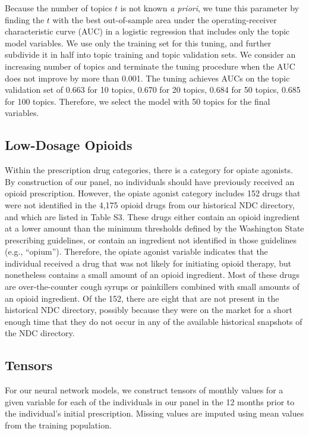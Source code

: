 \documentclass[9pt,twoside]{pnas-new}
\begin{document}
Because the number of topics $t$ is not known \emph{a priori}, we tune this parameter by finding the $t$ with the best out-of-sample area under the operating-receiver characteristic curve (AUC) in a logistic regression that includes only the topic model variables. We use only the training set for this tuning, and further subdivide it in half into topic training and topic validation sets. We consider an increasing number of topics and terminate the tuning procedure when the AUC does not improve by more than 0.001. The tuning achieves AUCs on the topic validation set of 0.663 for 10 topics, 0.670 for 20 topics, 0.684 for 50 topics, 0.685 for 100 topics. Therefore, we select the model with 50 topics for the final variables.

\subsection{Low-Dosage Opioids}

Within the prescription drug categories, there is a category for opiate agonists. By construction of our panel, no individuals should have previously received an opioid prescription. However, the opiate agonist category includes 152 drugs that were not identified in the 4,175 opioid drugs from our historical NDC directory, and which are listed in Table S3. These drugs either contain an opioid ingredient at a lower amount than the minimum thresholds defined by the Washington State prescribing guidelines, or contain an ingredient not identified in those guidelines (e.g., ``opium''). Therefore, the opiate agonist variable indicates that the individual received a drug that was not likely for initiating opioid therapy, but nonetheless contains a small amount of an opioid ingredient. Most of these drugs are over-the-counter cough syrups or painkillers combined with small amounts of an opioid ingredient. Of the 152, there are eight that are not present in the historical NDC directory, possibly because they were on the market for a short enough time that they do not occur in any of the available historical snapshots of the NDC directory.

\subsection{Tensors}

For our neural network models, we construct tensors of monthly values for a given variable for each of the individuals in our panel in the 12 months prior to the individual's initial prescription. Missing values are imputed using mean values from the training population.
\end{document}
